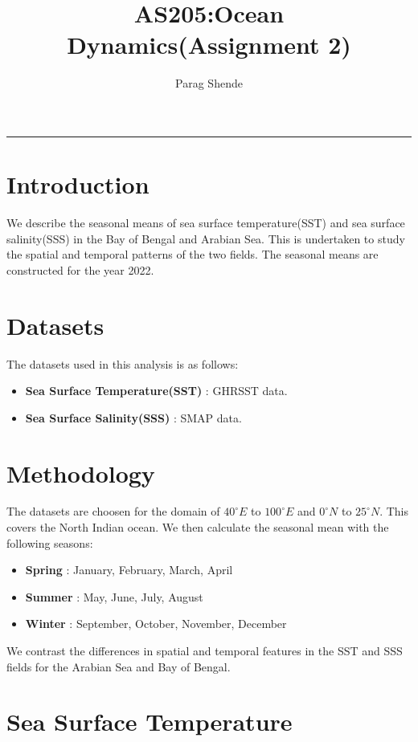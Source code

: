 \documentclass[20pt]{article}
\title{AS205:Ocean Dynamics(Assignment 2)}
\author{Parag Shende}
\begin{document}
\maketitle
\hrule

\section*{Introduction}

We describe the seasonal means of sea surface temperature(SST) and sea surface salinity(SSS) in the Bay of Bengal and Arabian Sea. 
This is undertaken to study the spatial and temporal patterns of the two fields. The seasonal means are constructed for the year 2022.

\section*{Datasets}

The datasets used in this analysis is as follows:

\begin{itemize}
    \item \textbf{Sea Surface Temperature(SST)} : GHRSST data.
    \item \textbf{Sea Surface Salinity(SSS)} : SMAP data.
\end{itemize}

\section*{Methodology}

The datasets are choosen for the domain of $40^{\circ} E$ to $100^{\circ}E$ and $0^{\circ} N$ to $25^{\circ} N$. This covers the
North Indian ocean. We then calculate the seasonal mean with the following seasons:
\begin{itemize}
    \item \textbf{Spring} : January, February, March, April
    \item \textbf{Summer} : May, June, July, August
    \item \textbf{Winter} : September, October, November, December
\end{itemize}

We contrast the differences in spatial and temporal features in the SST and SSS fields for the 
Arabian Sea and Bay of Bengal. 

\section*{Sea Surface Temperature}
\end{document}
